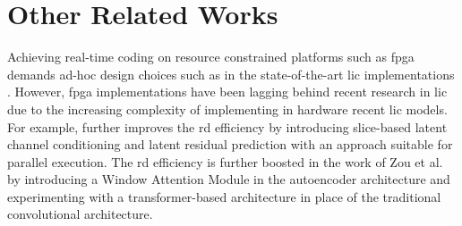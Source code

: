 \section{Other Related Works}
Achieving real-time coding on resource constrained platforms such as \acrshort{fpga} demands ad-hoc design choices such as in the state-of-the-art \acrshort{lic} implementations \cite{9745965, 10494759}. However, \acrshort{fpga} implementations have been lagging behind recent research in \acrshort{lic} due to the increasing complexity of implementing in hardware recent \acrshort{lic} models. For example, \cite{minnen2020channelwiseautoregressiveentropymodels} further improves the \acrshort{rd} efficiency by introducing slice-based latent channel conditioning and latent residual prediction with an approach suitable for parallel execution. The \acrshort{rd} efficiency is further boosted in the work of Zou et al. \cite{zou2022devildetailswindowbasedattention} by introducing a Window Attention Module in the autoencoder architecture and experimenting with a transformer-based architecture in place of the traditional convolutional architecture.